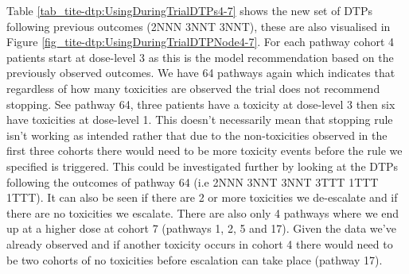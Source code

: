 Table \ref{tab_tite-dtp:UsingDuringTrialDTPs4-7} shows the new set of DTPs following previous outcomes (2NNN 3NNT 3NNT), these are also visualised in Figure \ref{fig_tite-dtp:UsingDuringTrialDTPNode4-7}. For each pathway cohort 4 patients start at dose-level 3 as this is the model recommendation based on the previously observed outcomes. We have 64 pathways again which indicates that regardless of how many toxicities are observed the trial does not recommend stopping. See pathway 64, three patients have a toxicity at dose-level 3 then six have toxicities at dose-level 1. This doesn't necessarily mean that stopping rule isn't working as intended rather that due to the non-toxicities observed in the first three cohorts there would need to be more toxicity events before the rule we specified is triggered. This could be investigated further by looking at the DTPs following the outcomes of pathway 64 (i.e 2NNN 3NNT 3NNT 3TTT 1TTT 1TTT). It can also be seen if there are 2 or more toxicities we de-escalate and if there are no toxicities we escalate. There are also only 4 pathways where we end up at a higher dose at cohort 7 (pathways 1, 2, 5 and 17). Given the data we've already observed and if another toxicity occurs in cohort 4 there would need to be two cohorts of no toxicities before escalation can take place (pathway 17). 


